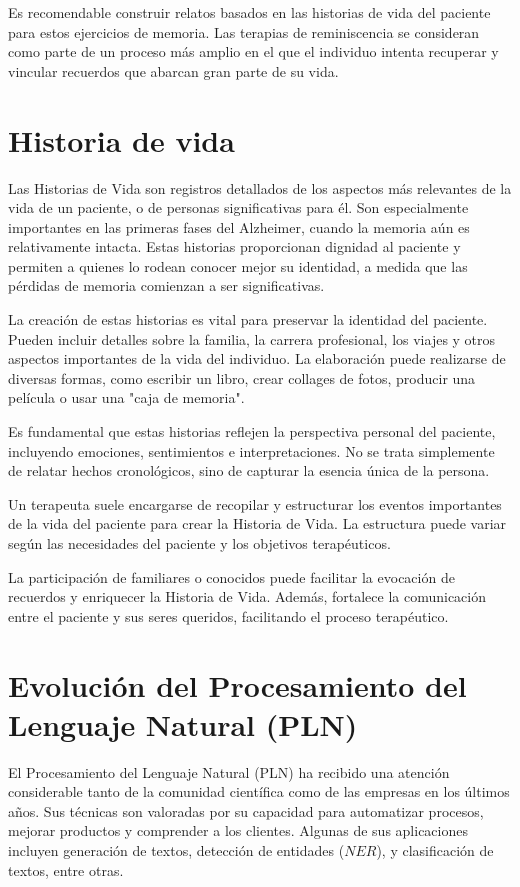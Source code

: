 Es recomendable construir relatos basados en las historias de vida del paciente para estos ejercicios de memoria. Las terapias de reminiscencia se consideran como parte de un proceso más amplio en el que el individuo intenta recuperar y vincular recuerdos que abarcan gran parte de su vida.
\section{Historia de vida}
Las Historias de Vida son registros detallados de los aspectos más relevantes de la vida de un paciente, o de personas significativas para él. Son especialmente importantes en las primeras fases del Alzheimer, cuando la memoria aún es relativamente intacta. Estas historias proporcionan dignidad al paciente y permiten a quienes lo rodean conocer mejor su identidad, a medida que las pérdidas de memoria comienzan a ser significativas.

La creación de estas historias es vital para preservar la identidad del paciente. Pueden incluir detalles sobre la familia, la carrera profesional, los viajes y otros aspectos importantes de la vida del individuo. La elaboración puede realizarse de diversas formas, como escribir un libro, crear collages de fotos, producir una película o usar una "caja de memoria".

Es fundamental que estas historias reflejen la perspectiva personal del paciente, incluyendo emociones, sentimientos e interpretaciones. No se trata simplemente de relatar hechos cronológicos, sino de capturar la esencia única de la persona.

Un terapeuta suele encargarse de recopilar y estructurar los eventos importantes de la vida del paciente para crear la Historia de Vida. La estructura puede variar según las necesidades del paciente y los objetivos terapéuticos.

La participación de familiares o conocidos puede facilitar la evocación de recuerdos y enriquecer la Historia de Vida. Además, fortalece la comunicación entre el paciente y sus seres queridos, facilitando el proceso terapéutico.

\section{Evolución del Procesamiento del Lenguaje Natural (PLN)}

El Procesamiento del Lenguaje Natural (PLN) ha recibido una atención considerable tanto de la comunidad científica como de las empresas en los últimos años. Sus técnicas son valoradas por su capacidad para automatizar procesos, mejorar productos y comprender a los clientes. Algunas de sus aplicaciones incluyen generación de textos, detección de entidades ($NER$), y clasificación de textos, entre otras. \\

